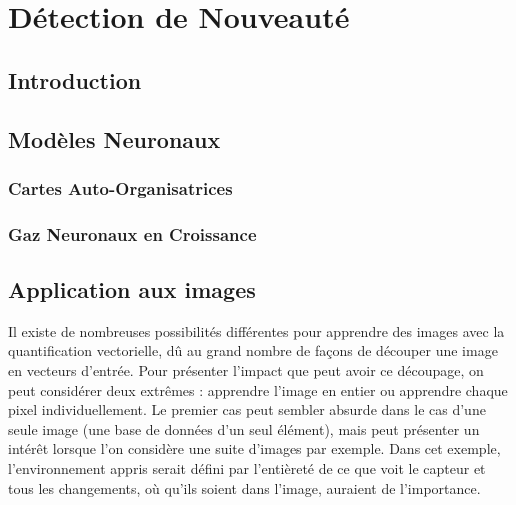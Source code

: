 
\chapter{Détection de Nouveauté}
	\minitoc
	\newpage




			
	\section{Introduction}
	\section{Modèles Neuronaux}
	\subsection{Cartes Auto-Organisatrices}
	\subsection{Gaz Neuronaux en Croissance}

	\newpage
	\section{Application aux images}\label{sec:images}

	Il existe de nombreuses possibilités différentes pour apprendre des images avec la quantification vectorielle, dû au grand nombre de façons de découper une image en vecteurs d'entrée. Pour présenter l'impact que peut avoir ce découpage, on peut considérer deux extrêmes : apprendre l'image en entier ou apprendre chaque pixel individuellement. Le premier cas peut sembler absurde dans le cas d'une seule image (une base de données d'un seul élément), mais peut présenter un intérêt lorsque l'on considère une suite d'images par exemple. Dans cet exemple, l'environnement appris serait défini par l'entièreté de ce que voit le capteur et tous les changements, où qu'ils soient dans l'image, auraient de l'importance.

